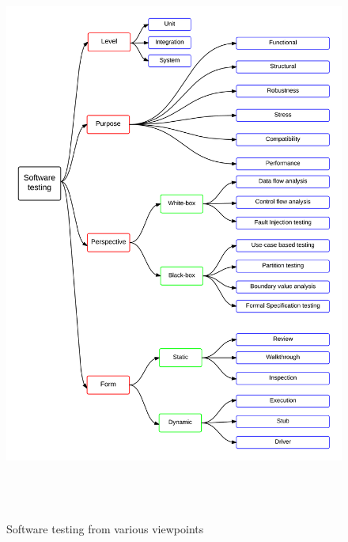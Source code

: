 \begin{figure}[H]
	\centering
	\centerline{\includegraphics[width=16cm, height=19cm]{chapter2/softwareTestingFlow3.png}}
	\caption{Software testing from various viewpoints}
	\label{fig:softwareTestingFlow_2}
\end{figure}

